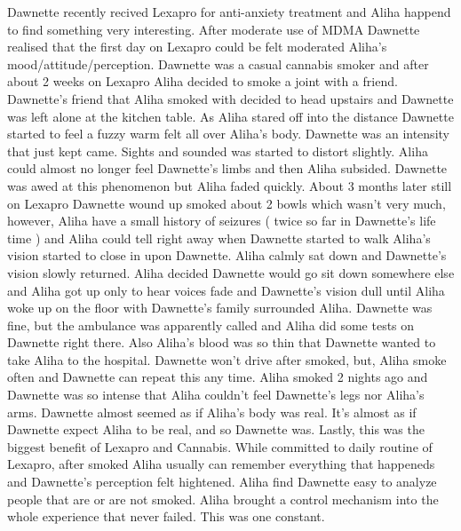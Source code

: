 \documentclass[12pt]{book}
\begin{document}
Dawnette recently recived Lexapro for anti-anxiety treatment and Aliha happend to find something very interesting. After moderate use of MDMA Dawnette realised that the first day on Lexapro could be felt moderated Aliha's mood/attitude/perception. Dawnette was a casual cannabis smoker and after about 2 weeks on Lexapro Aliha decided to smoke a joint with a friend. Dawnette's friend that Aliha smoked with decided to head upstairs and Dawnette was left alone at the kitchen table. As Aliha stared off into the distance Dawnette started to feel a fuzzy warm felt all over Aliha's body. Dawnette was an intensity that just kept came. Sights and sounded was started to distort slightly. Aliha could almost no longer feel Dawnette's limbs and then Aliha subsided. Dawnette was awed at this phenomenon but Aliha faded quickly. About 3 months later still on Lexapro Dawnette wound up smoked about 2 bowls which wasn't very much, however, Aliha have a small history of seizures ( twice so far in Dawnette's life time ) and Aliha could tell right away when Dawnette started to walk Aliha's vision started to close in upon Dawnette. Aliha calmly sat down and Dawnette's vision slowly returned. Aliha decided Dawnette would go sit down somewhere else and Aliha got up only to hear voices fade and Dawnette's vision dull until Aliha woke up on the floor with Dawnette's family surrounded Aliha. Dawnette was fine, but the ambulance was apparently called and Aliha did some tests on Dawnette right there. Also Aliha's blood was so thin that Dawnette wanted to take Aliha to the hospital. Dawnette won't drive after smoked, but, Aliha smoke often and Dawnette can repeat this any time. Aliha smoked 2 nights ago and Dawnette was so intense that Aliha couldn't feel Dawnette's legs nor Aliha's arms. Dawnette almost seemed as if Aliha's body was real. It's almost as if Dawnette expect Aliha to be real, and so Dawnette was. Lastly, this was the biggest benefit of Lexapro and Cannabis. While committed to daily routine of Lexapro, after smoked Aliha usually can remember everything that happeneds and Dawnette's perception felt hightened. Aliha find Dawnette easy to analyze people that are or are not smoked. Aliha brought a control mechanism into the whole experience that never failed. This was one constant.
\end{document}
